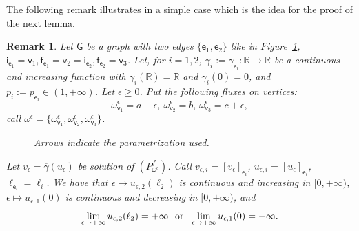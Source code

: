 \documentclass[reqno,12pt]{amsart}
\newtheorem{remark}[theorem]{Remark}
\def\e{\mathsf{e}} 	%
\def\v{\mathsf{v}}	%
\newcommand{\vi}{\mathsf{i}} %
\newcommand{\vf}{\mathsf{f}} %
\newcommand{\G}{\mathsf{G}}	%
\numberwithin{equation}{section} %
\begin{document}
 
 The following remark illustrates in a simple case which is the idea for the proof of the next lemma.
\begin{remark}\label{nuevolemma01}\rm
   Let $\G$ be a graph with two edges $\{\e_1,\e_2\}$ like in Figure~\ref{fig:002}, $\vi_{\e_1}=\v_1, \vf_{\e_1}=\v_2=\vi_{\e_2}, \vf_{\e_2}=\v_3$. Let, for $i=1,2$, $\gamma_i:=\gamma_{\e_i}:\mathbb{R}\to \mathbb{R}$ 
be a continuous and increasing function with $\gamma_i(\mathbb{R})=\mathbb{R}$ and $\gamma_i(0)=0$, and $p_i:=p_{\e_i}\in(1,+\infty)$.
Let $\epsilon\ge 0$. Put the following fluxes on vertices:
$$\omega_{\v_1}^\epsilon=a-\epsilon, \ \omega_{\v_2}^\epsilon=b,\, \omega_{\v_3}^\epsilon=c+\epsilon,$$
call $\omega^\epsilon=\{\omega^\epsilon_{\v_1},\omega^\epsilon_{\v_2},\omega^\epsilon_{\v_3}\}$.
\begin{figure}[ht]
\centering
{}
\caption{Arrows indicate the parametrization used.}
\label{fig:002}
\end{figure}
Let $v_\epsilon=\overline\gamma(u_\epsilon)$ be  solution of $(P_{\omega^\epsilon}^f)$. 
Call $v_{\epsilon,i}=[v_\epsilon]_{\e_i}$, $u_{\epsilon,i}=[u_\epsilon]_{\e_i}$, $\ell_{\e_i}=\ell_i$. We have that $\epsilon\mapsto u_{\epsilon,2}(\ell_2)$ is continuous and increasing in $[0,+\infty)$,  $\epsilon\mapsto u_{\epsilon,1}(0)$ is continuous and decreasing in $[0,+\infty)$,  and 
\begin{equation}\label{luns0001} \lim_{\epsilon\to +\infty}u_{\epsilon,2}(\ell_2)=+\infty 
 \ \hbox{ or }\ \lim_{\epsilon\to +\infty}u_{\epsilon,1}(0)=-\infty.
\end{equation}


\end{remark}
\end{document}
